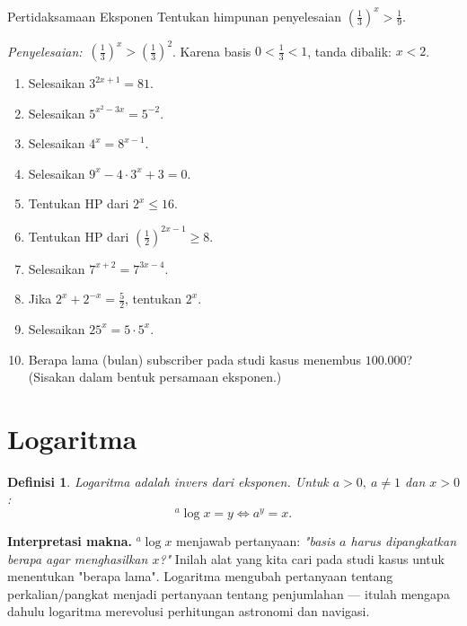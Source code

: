 \documentclass[11pt,a4paper]{report}
\theoremstyle{gaya}
\newtheorem{definisi}{Definisi}[chapter]
\newcommand{\jawab}{\par\smallskip\noindent\textit{\textcolor{oranye}{Penyelesaian:}}\ }
\begin{document}
\begin{contoh}{Pertidaksamaan Eksponen}
Tentukan himpunan penyelesaian $\left(\tfrac13\right)^{x} > \tfrac{1}{9}$.

\jawab $\left(\tfrac13\right)^x>\left(\tfrac13\right)^2$. Karena basis $0<\tfrac13<1$, tanda dibalik: $x<2$.
\end{contoh}

\begin{latihan}
\begin{enumerate}[leftmargin=*]
  \item Selesaikan $3^{2x+1}=81$.
  \item Selesaikan $5^{x^2-3x}=5^{-2}$.
  \item Selesaikan $4^x = 8^{x-1}$.
  \item Selesaikan $9^x-4\cdot3^x+3=0$.
  \item Tentukan HP dari $2^{x} \le 16$.
  \item Tentukan HP dari $\left(\tfrac12\right)^{2x-1} \ge 8$.
  \item Selesaikan $7^{x+2}=7^{3x-4}$.
  \item Jika $2^{x}+2^{-x}=\tfrac52$, tentukan $2^x$.
  \item Selesaikan $25^x = 5\cdot 5^{x}$.
  \item Berapa lama (bulan) subscriber pada studi kasus menembus $100.000$? (Sisakan dalam bentuk persamaan eksponen.)
\end{enumerate}
\end{latihan}

\section{Logaritma}
\begin{definisi}
\emph{Logaritma} adalah invers dari eksponen. Untuk $a>0,\ a\neq 1$ dan $x>0$:
\[
{}^{a}\!\log x = y \iff a^y = x.
\]
\end{definisi}

\textbf{Interpretasi makna.} ${}^{a}\!\log x$ menjawab pertanyaan: \emph{"basis $a$ harus dipangkatkan berapa agar menghasilkan $x$?"} Inilah alat yang kita cari pada studi kasus untuk menentukan "berapa lama". Logaritma mengubah pertanyaan tentang perkalian/pangkat menjadi pertanyaan tentang penjumlahan --- itulah mengapa dahulu logaritma merevolusi perhitungan astronomi dan navigasi.
\end{document}

